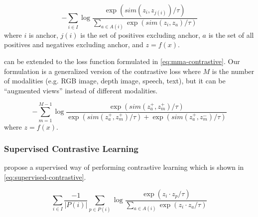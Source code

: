 \documentclass[sigconf,natbib=true,anonymous=true]{acmart}
\begin{document}
\begin{equation}\label{eq:contrastive-loss}
    -\sum_{i \in I} \log \frac{\exp (sim(z_i , z_{j(i)}) / \tau) }{\sum_{a \in A(i)} \exp (sim(z_i, z_a) / \tau)}
\end{equation}
where $i$ is anchor, $j(i)$ is the set of positives excluding anchor, $a$ is the set of all positives and negatives excluding anchor, and $z = f(x)$.

 can be extended to the loss function formulated in \cref{eq:mma-contrastive}. Our formulation is a generalized version of the contrastive loss where $M$ is the number of modalities (e.g. RGB image, depth image, speech, text), but it can be ``augmented views'' instead of different modalities.

\begin{equation}\label{eq:mma-contrastive}
    -\sum_{m=1}^{M-1} \log \frac{\exp (sim(z_a^+ , z_{m}^{+})/ \tau) }{ \exp (sim(z_a^+ , z_{m}^{+}) / \tau) + \exp (sim(z_a^+, z_{m}^{-}) / \tau)}
\end{equation}
where $z = f(x)$.


\subsubsection{Supervised Contrastive Learning}
\label{sub:baseline-supcon}

\citet{NEURIPS2020_supervised_contrastive} propose a supervised way of performing contrastive learning which is shown in \cref{eq:supervised-contrastive}.

\begin{equation}\label{eq:supervised-contrastive}
    \sum_{i \in I} \frac{-1}{|P(i)|} \sum_{p \in P(i)} \log \frac{\exp (z_i \cdot z_p / \tau) }{\sum_{a \in A(i)} \exp (z_i \cdot z_a / \tau)}
\end{equation}

\end{document}
